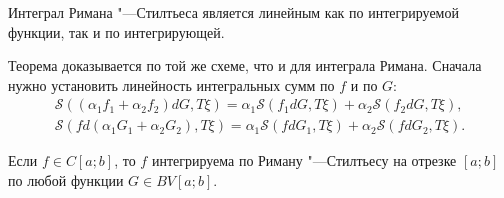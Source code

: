 \begin{theorem}
    Интеграл Римана "---Стилтьеса является линейным как по интегрируемой функции, так и по интегрирующей.
\end{theorem}

\begin{remark}
    Теорема доказывается по той же схеме, что и для интеграла Римана. Сначала нужно установить линейность интегральных сумм по $f$ и по $G$:
    \begin{gather*}
        \mathcal{S}((\alpha_1f_1 + \alpha_2f_2)dG, T\xi) = \alpha_1\mathcal{S}(f_1dG, T\xi) + \alpha_2\mathcal{S}(f_2dG, T\xi),\\
        \mathcal{S}(fd(\alpha_1G_1 + \alpha_2G_2), T\xi) = \alpha_1\mathcal{S}(fdG_1, T\xi) + \alpha_2\mathcal{S}(fdG_2, T\xi).
    \end{gather*}
\end{remark}

\begin{theorem}
    Если $f \in C[a; b]$, то $f$ интегрируема по Риману "---Стилтьесу на отрезке $[a; b]$ по любой функции $G \in BV[a; b]$.
\end{theorem}

